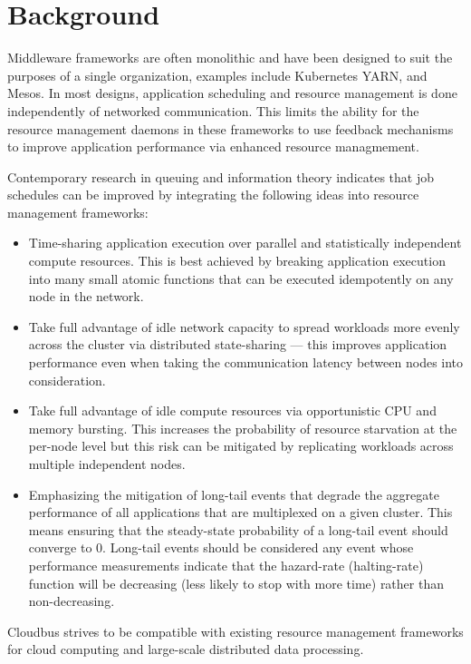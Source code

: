 \section{Background}
Middleware frameworks are often monolithic and have been designed to suit the purposes of a single organization, examples include Kubernetes %
YARN, and Mesos. In most designs, application scheduling and resource management is done independently of networked communication. This limits %
the ability for the resource management daemons in these frameworks to use feedback mechanisms to improve application performance via enhanced %
resource managmement. 

Contemporary research in queuing and information theory indicates that job schedules can be improved by integrating the following %
ideas into resource management frameworks:
\begin{itemize}
	\item Time-sharing application execution over parallel and statistically independent compute resources. This is best achieved by %
	breaking application execution into many small atomic functions that can be executed idempotently on any node in the network.
	\item Take full advantage of idle network capacity to spread workloads more evenly across the cluster via distributed state-sharing %
	--- this improves application performance even when taking the communication latency between nodes into consideration.
	\item Take full advantage of idle compute resources via opportunistic CPU and memory bursting. This increases the probability of resource %
	starvation at the per-node level but this risk can be mitigated by replicating workloads across multiple independent nodes.
	\item Emphasizing the mitigation of long-tail events that degrade the aggregate performance of all applications that are multiplexed %
	on a given cluster. This means ensuring that the steady-state probability of a long-tail event should converge to 0. Long-tail %
	events should be considered any event whose performance measurements indicate that the hazard-rate (halting-rate) function will %
	be decreasing (less likely to stop with more time) rather than non-decreasing.
\end{itemize}

Cloudbus strives to be compatible with existing resource management frameworks for cloud computing and large-scale distributed data processing.